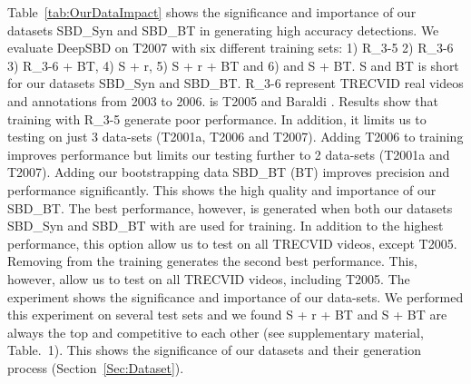\documentclass[journal]{IEEEtran}
\begin{document}
Table~\ref{tab:OurDataImpact} shows the significance and importance of our datasets SBD\_Syn and SBD\_BT in generating high accuracy detections. We evaluate DeepSBD on T2007 with six different training sets: 1) R\_3-5 2) R\_3-6 3) R\_3-6 + BT, 4) S + r, 5) S + r + BT and 6) and S + BT. S and BT is short for our datasets SBD\_Syn and SBD\_BT. R\_3-6 represent TRECVID real videos and annotations from 2003 to 2006.  is T2005 and Baraldi \cite{Baraldi15}. Results show that training with R\_3-5  generate poor performance. In addition, it limits us to testing on just 3 data-sets (T2001a, T2006 and T2007). Adding T2006 to training improves performance but limits our testing further to 2 data-sets (T2001a and T2007). Adding our bootstrapping data SBD\_BT (BT) improves precision and performance significantly. This shows the high quality and importance of our SBD\_BT. The best performance, however, is generated when both our datasets SBD\_Syn and SBD\_BT with  are used for training. In addition to the highest performance, this option allow us to test on all TRECVID videos, except T2005. Removing  from the training generates the second best performance. This, however, allow us to test on all TRECVID videos, including T2005. The experiment shows the significance and importance of our data-sets. We performed this experiment on several test sets and we found S + r + BT and S + BT are always the top and competitive to each other (see supplementary material, Table.~1). This shows the significance of our datasets and their generation process (Section~\ref{Sec:Dataset}).  
\end{document}
